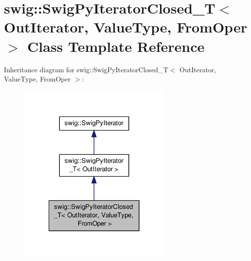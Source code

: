 \hypertarget{classswig_1_1_swig_py_iterator_closed___t}{\section{swig\-:\-:Swig\-Py\-Iterator\-Closed\-\_\-\-T$<$ Out\-Iterator, Value\-Type, From\-Oper $>$ Class Template Reference}
\label{classswig_1_1_swig_py_iterator_closed___t}
}


Inheritance diagram for swig\-:\-:Swig\-Py\-Iterator\-Closed\-\_\-\-T$<$ Out\-Iterator, Value\-Type, From\-Oper $>$\-:\nopagebreak
\begin{figure}[H]
\begin{center}
\leavevmode
\includegraphics[width=218pt]{classswig_1_1_swig_py_iterator_closed___t__inherit__graph}
\end{center}
\end{figure}

